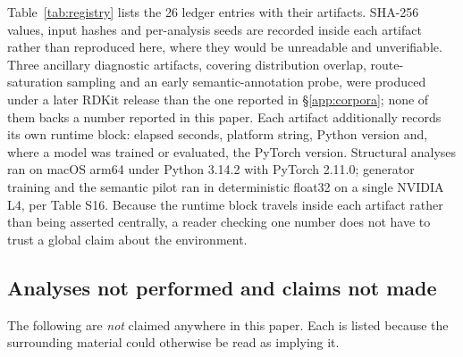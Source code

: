 \documentclass{article}
\newcounter{none}
\begin{document}
Table~\ref{tab:registry} lists the 26 ledger entries with their artifacts. SHA-256 values, input
hashes and per-analysis seeds are recorded inside each artifact rather than reproduced here, where
they would be unreadable and unverifiable. Three ancillary diagnostic artifacts, covering
distribution overlap, route-saturation sampling and an early semantic-annotation probe, were produced
under a later RDKit release than the one reported in \S\ref{app:corpora}; none of them backs a number
reported in this paper.
Each artifact additionally records its own runtime block: elapsed seconds, platform string, Python version and, where a model was trained or evaluated, the PyTorch version. Structural analyses ran on macOS arm64 under Python 3.14.2 with PyTorch 2.11.0; generator training and the semantic pilot ran in deterministic float32 on a single NVIDIA L4, per Table S16. Because the runtime block travels inside each artifact rather than being asserted centrally, a reader checking one number does not have to trust a global claim about the environment.

\subsection{Analyses not performed and claims not made}
\label{app:nonclaims}
The following are \emph{not} claimed anywhere in this paper. Each is listed because the surrounding
material could otherwise be read as implying it.
\end{document}

